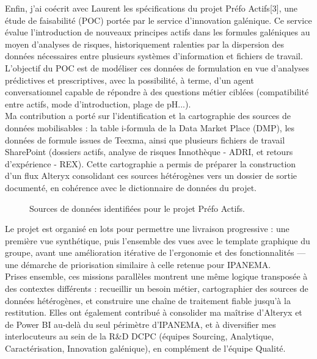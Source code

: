 Enfin, j'ai coécrit avec Laurent les spécifications du projet Préfo Actifs[3], une étude de 
faisabilité (POC) portée par le service d'innovation galénique. Ce service évalue l'introduction 
de nouveaux principes actifs dans les formules galéniques au moyen d'analyses de risques, 
historiquement ralenties par la dispersion des données nécessaires entre plusieurs systèmes 
d'information et fichiers de travail. L'objectif du POC est de modéliser ces données de 
formulation en vue d'analyses prédictives et prescriptives, avec la possibilité, à terme, d'un 
agent conversationnel capable de répondre à des questions métier ciblées (compatibilité entre 
actifs, mode d'introduction, plage de pH...). \\

Ma contribution a porté sur l'identification et la cartographie des sources de données 
mobilisables : la table i-formula de la Data Market Place (DMP), les données de formule issues 
de Teexma, ainsi que plusieurs fichiers de travail SharePoint (dossiers actifs, analyse de 
risques Innothèque - ADRI, et retours d'expérience - REX). Cette cartographie a permis de 
préparer la construction d'un flux Alteryx consolidant ces sources hétérogènes vers un dossier 
de sortie documenté, en cohérence avec le dictionnaire de données du projet. 

\begin{figure}[H]
  \centering
  \caption{Sources de données identifiées pour le projet Préfo Actifs.}
  \label{fig:Sources_de_données_identifiées_pour_le_projet_Préfo_Actifs}
\end{figure}

Le projet est organisé en lots pour permettre une livraison progressive : une première 
vue synthétique, puis l'ensemble des vues avec le template graphique du groupe, avant une 
amélioration itérative de l'ergonomie et des fonctionnalités — une démarche de priorisation 
similaire à celle retenue pour IPANEMA. \\

Prises ensemble, ces missions parallèles montrent une même logique transposée à des 
contextes différents : recueillir un besoin métier, cartographier des sources de données 
hétérogènes, et construire une chaîne de traitement fiable jusqu'à la restitution. Elles ont 
également contribué à consolider ma maîtrise d'Alteryx et de Power BI au-delà du seul 
périmètre d'IPANEMA, et à diversifier mes interlocuteurs au sein de la R\&D DCPC (équipes 
Sourcing, Analytique, Caractérisation, Innovation galénique), en complément de l'équipe 
Qualité.

